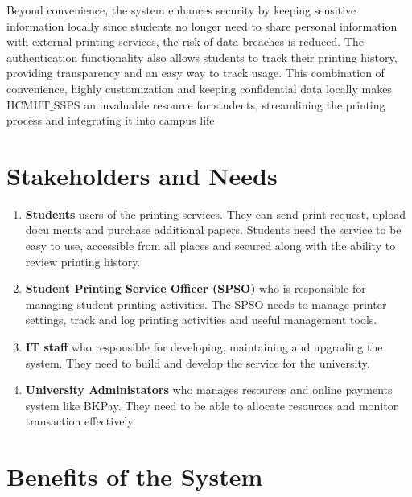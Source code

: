 \documentclass[a4paper]{report}
\begin{document}
Beyond convenience, the system enhances security by keeping sensitive information locally since students no longer need to share personal information with external printing services, the risk of data breaches is reduced. The authentication functionality also allows students to track their printing history, providing transparency and an easy way to track usage. This combination of convenience, highly customization and keeping confidential data locally makes HCMUT$\_$SSPS an invaluable resource for students, streamlining the printing process and integrating it into campus life

\section{Stakeholders and Needs}
\vspace{-0.2em}
\begin{enumerate}[label=\textbf{\arabic*}.]
    \item \textbf{Students}
    users of the printing services. They can send print request, upload docu ments and purchase additional papers.  Students need the service to be easy to use, accessible from all places and secured along with the ability to review printing history.  
    \item \textbf{Student Printing Service Officer (SPSO)}
    who is responsible for managing student printing activities. The SPSO needs to manage printer settings, track and log printing activities and useful management tools.
    \item \textbf{IT staff}
    who responsible for developing, maintaining and upgrading the system. They need to build and develop the service for the university. 
    \item \textbf{University Administators}
    who manages resources and online payments system like BKPay. They need to be able to allocate resources and monitor transaction effectively. 
\end{enumerate}

\section{Benefits of the System}
\end{document}
